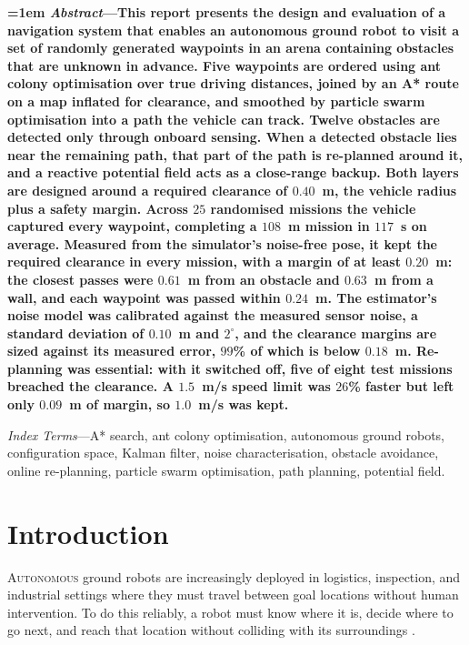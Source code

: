 {\small\bfseries\emergencystretch=1em
\noindent\hspace{1em}\textit{Abstract}---This report presents the design and
evaluation of a navigation system that enables an autonomous ground robot to
visit a set of randomly generated waypoints in an arena containing obstacles
that are unknown in advance. Five waypoints are ordered using ant colony
optimisation over true driving distances, joined by an A* route on a map
inflated for clearance, and smoothed by particle swarm optimisation into a
path the vehicle can track. Twelve obstacles are detected only through onboard
sensing. When a detected obstacle lies near the remaining path, that part of
the path is re-planned around it, and a reactive potential field acts as a
close-range backup. Both layers are designed around a required clearance of
$0.40$~m, the vehicle radius plus a safety margin.
Across $25$ randomised missions the vehicle captured every waypoint,
completing a $108$~m mission in $117$~s on average. Measured from the
simulator's noise-free pose, it kept the required clearance in every
mission, with a margin of at least $0.20$~m: the closest passes were
$0.61$~m from an obstacle and $0.63$~m from a wall, and each waypoint
was passed within $0.24$~m. The estimator's
noise model was calibrated against the measured sensor noise, a
standard deviation of $0.10$~m and $2^{\circ}$, and the clearance
margins are sized against its measured error, $99$\% of which is below
$0.18$~m. Re-planning was essential: with it switched off, five of eight
test missions breached the clearance. A $1.5$~m/s speed limit was $26$\%
faster but left only $0.09$~m of margin, so $1.0$~m/s was kept.

\hspace{1em}\textit{Index Terms}---A* search, ant colony optimisation,
autonomous ground robots, configuration space, Kalman filter, noise
characterisation, obstacle avoidance, online re-planning, particle
swarm optimisation, path planning, potential field.
\par}
\vspace{0.6em}


\section{Introduction}
\label{sec:intro}

\lettrine{A}{utonomous} ground robots are increasingly deployed in
logistics, inspection, and industrial settings where they must travel
between goal locations without human intervention. To do this reliably,
a robot must know where it is, decide where to go next, and reach that
location without colliding with its surroundings \cite{sanchez2021}.

